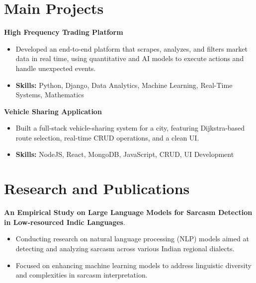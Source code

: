 \documentclass[a4paper,11pt]{article}
\begin{document}
\section{\textbf{Main Projects}}

\vspace{1mm}
  \textbf{High Frequency Trading Platform  }
\vspace{-1.5mm} %
\begin{itemize}
  \item Developed an end-to-end platform that scrapes, analyzes, and filters market data in real time, using quantitative and AI models to execute actions and handle unexpected events.
\vspace{-3mm}
  \item \textbf{Skills:} Python, Django, Data Analytics, Machine Learning, Real-Time Systems, Mathematics
\end{itemize}


\vspace{1mm}
   \textbf{Vehicle Sharing Application }
\vspace{-1.5mm} %
\begin{itemize}
  \item Built a full-stack vehicle-sharing system for a city, featuring Dijkstra-based route selection, real-time CRUD operations, and a clean UI.
\vspace{-3mm}
  \item \textbf{Skills:} NodeJS, React, MongoDB, JavaScript, CRUD, UI Development
\end{itemize}



\section{\textbf{Research and Publications} \hfill }
\vspace{1mm}
  \textbf{An Empirical Study on Large Language Models for Sarcasm Detection in Low-resourced Indic Languages}.
\vspace{-1mm} %
\begin{itemize}
  \item Conducting research on natural language processing (NLP) models aimed at detecting and analyzing sarcasm across various Indian regional dialects.
\vspace{-3mm}
  \item Focused on enhancing machine learning models to address linguistic diversity and complexities in sarcasm interpretation.
\end{itemize}
\end{document}
